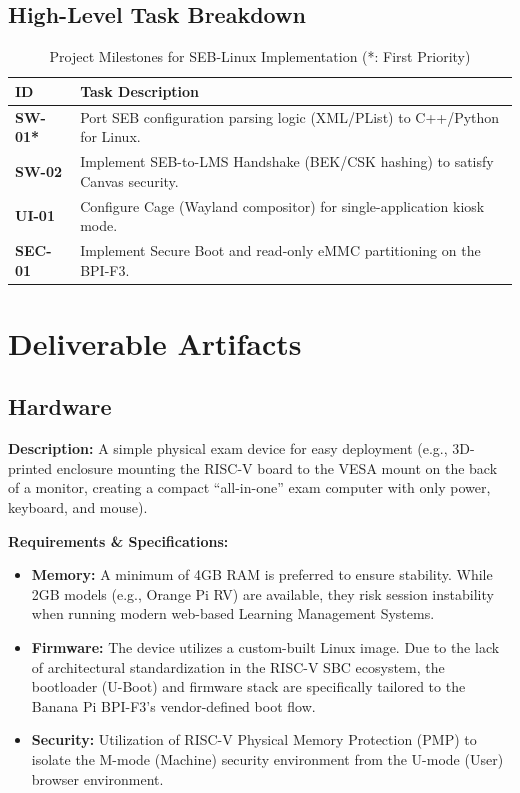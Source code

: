 \documentclass[11pt]{article}
\begin{document}
\subsection{High-Level Task Breakdown}
\begin{table}[h!]
\centering
\begin{tabularx}{\textwidth}{|l|X|}
\hline
\textbf{ID} & \textbf{Task Description} \\ \hline
\textbf{SW-01*} & Port SEB configuration parsing logic (XML/PList) to C++/Python for Linux. \\ \hline
\textbf{SW-02} & Implement SEB-to-LMS Handshake (BEK/CSK hashing) to satisfy Canvas security. \\ \hline
\textbf{UI-01} & Configure Cage (Wayland compositor) for single-application kiosk mode. \\ \hline
\textbf{SEC-01} & Implement Secure Boot and read-only eMMC partitioning on the BPI-F3. \\ \hline
\end{tabularx}
\caption{Project Milestones for SEB-Linux Implementation (*: First Priority)}
\end{table}

\newpage
\section{Deliverable Artifacts}

\subsection{Hardware}

\textbf{Description:} 
A simple physical exam device for easy deployment (e.g., 3D-printed enclosure mounting the RISC-V board to the VESA mount on the back of a monitor, creating a compact ``all-in-one'' exam computer with only power, keyboard, and mouse).

\textbf{Requirements \& Specifications:}
\begin{itemize}
    \item \textbf{Memory:} A minimum of 4GB RAM is preferred to ensure stability. While 2GB models (e.g., Orange Pi RV) are available, they risk session instability when running modern web-based Learning Management Systems.
    \item \textbf{Firmware:} The device utilizes a custom-built Linux image. Due to the lack of architectural standardization in the RISC-V SBC ecosystem, the bootloader (U-Boot) and firmware stack are specifically tailored to the Banana Pi BPI-F3’s vendor-defined boot flow.
    \item \textbf{Security:} Utilization of RISC-V Physical Memory Protection (PMP) to isolate the M-mode (Machine) security environment from the U-mode (User) browser environment.
\end{itemize}
\end{document}
